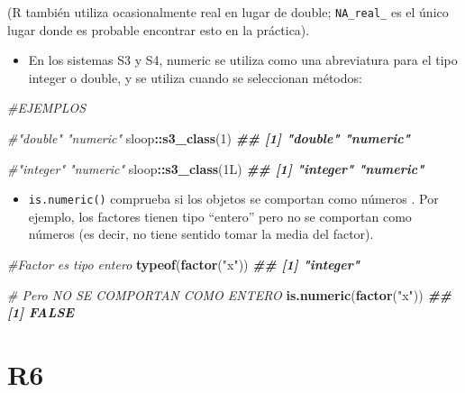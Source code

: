 \documentclass[
]{book}
\newenvironment{Shaded}{\begin{snugshade}}{\end{snugshade}}
\newcommand{\CommentTok}[1]{\textcolor[rgb]{0.56,0.35,0.01}{\textit{#1}}}
\newcommand{\DecValTok}[1]{\textcolor[rgb]{0.00,0.00,0.81}{#1}}
\newcommand{\DocumentationTok}[1]{\textcolor[rgb]{0.56,0.35,0.01}{\textbf{\textit{#1}}}}
\newcommand{\FunctionTok}[1]{\textcolor[rgb]{0.13,0.29,0.53}{\textbf{#1}}}
\newcommand{\NormalTok}[1]{#1}
\newcommand{\SpecialCharTok}[1]{\textcolor[rgb]{0.81,0.36,0.00}{\textbf{#1}}}
\newcommand{\StringTok}[1]{\textcolor[rgb]{0.31,0.60,0.02}{#1}}
\providecommand{\tightlist}{%
  \setlength{\itemsep}{0pt}\setlength{\parskip}{0pt}}
\begin{document}
(R también utiliza ocasionalmente real en lugar de double; \texttt{NA\_real\_} es el único lugar donde es probable encontrar esto en la práctica).

\begin{itemize}
\tightlist
\item
  En los sistemas S3 y S4, numeric se utiliza como una abreviatura para el tipo integer o double, y se utiliza cuando se seleccionan métodos:
\end{itemize}

\begin{Shaded}
\begin{Highlighting}[]

\CommentTok{\#EJEMPLOS}

\CommentTok{\#"double" "numeric"}
\NormalTok{sloop}\SpecialCharTok{::}\FunctionTok{s3\_class}\NormalTok{(}\DecValTok{1}\NormalTok{)}
\DocumentationTok{\#\# [1] "double"  "numeric"}

\CommentTok{\#"integer" "numeric"}
\NormalTok{sloop}\SpecialCharTok{::}\FunctionTok{s3\_class}\NormalTok{(1L)}
\DocumentationTok{\#\# [1] "integer" "numeric"}
\end{Highlighting}
\end{Shaded}

\begin{itemize}
\tightlist
\item
  \texttt{is.numeric()} comprueba si los objetos se comportan como números . Por ejemplo, los factores tienen tipo ``entero'' pero no se comportan como números (es decir, no tiene sentido tomar la media del factor).
\end{itemize}

\begin{Shaded}
\begin{Highlighting}[]

\CommentTok{\#Factor es tipo entero }
\FunctionTok{typeof}\NormalTok{(}\FunctionTok{factor}\NormalTok{(}\StringTok{"x"}\NormalTok{))}
\DocumentationTok{\#\# [1] "integer"}


\CommentTok{\# Pero NO SE COMPORTAN COMO ENTERO }
\FunctionTok{is.numeric}\NormalTok{(}\FunctionTok{factor}\NormalTok{(}\StringTok{"x"}\NormalTok{))}
\DocumentationTok{\#\# [1] FALSE}
\end{Highlighting}
\end{Shaded}

\hypertarget{r6}{%
\chapter{R6}\label{r6}}
\end{document}
